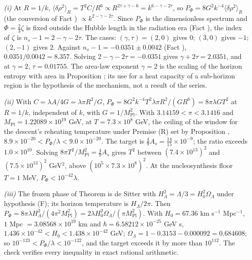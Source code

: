 \emph{(i)} At $R = 1/k$, $\langle\delta\rho^{2}\rangle_{R} = T^{2}C/R^{6} \propto R^{2\tau + \gamma - 6} = k^{6 - \gamma - 2\tau}$, so $P_{\Phi} = 8G^{2}k^{-4}\langle\delta\rho^{2}\rangle_{R}$ (the conversion of Fact ) $\propto k^{2 - \gamma - 2\tau}$. Since $P_{\Phi}$ is the dimensionless spectrum and $\Phi = \tfrac23\zeta$ is fixed outside the Hubble length in the radiation era (Fact ), the index of $\zeta$ is $n_{s} - 1 = 2 - \gamma - 2\tau$. The cases: $(\gamma, \tau) = (2, 0)$ gives $0$; $(3, 0)$ gives $-1$; $(2, -1)$ gives $2$. Against $n_{s} - 1 = -0.0351 \pm 0.0042$ (Fact ), $0.0351/0.0042 = 8.357$. Solving $2 - \gamma - 2\tau = -0.0351$ gives $\gamma + 2\tau = 2.0351$, and at $\gamma = 2$, $\tau = 0.01755$. The area-law exponent $\gamma = 2$ is the scaling of the horizon entropy with area in Proposition ; its use for a heat capacity of a sub-horizon region is the hypothesis of the mechanism, not a result of the series.

\emph{(ii)} With $C = \lambda A/4G = \lambda\pi R^{2}/G$, $P_{\Phi} = 8G^{2}k^{-4}T^{2}\lambda\pi R^{2}/(GR^{6}) = 8\pi\lambda G T^{2}$ at $R = 1/k$, independent of $k$, with $G = 1/M_{\mathrm{Pl}}^{2}$. With $3.14159 < \pi < 3.1416$ and $M_{\mathrm{Pl}} = 1.22089 \times 10^{19}$ GeV, at $T = 7.3 \times 10^{8}$ GeV, the ceiling of the window for the descent's reheating temperature under Premise (R) set by Proposition , $8.9 \times 10^{-20} < P_{\Phi}/\lambda < 9.0 \times 10^{-20}$. The target is $\tfrac49 A_{s} = \tfrac{14}{15} \times 10^{-9}$; the ratio exceeds $1.0 \times 10^{10}$. Solving $8\pi T^{2}/M_{\mathrm{Pl}}^{2} = \tfrac49 A_{s}$ gives $T^{2}$ between $(7.4 \times 10^{13})^{2}$ and $(7.5 \times 10^{13})^{2}$ GeV$^{2}$, above $(10^{5} \times 7.3 \times 10^{8})^{2}$. At the nucleosynthesis floor $T = 1$ MeV, $P_{\Phi} < 10^{-42}\lambda$.

\emph{(iii)} The frozen phase of Theorem  is de Sitter with $H_{\Lambda}^{2} = \Lambda/3 = H_{0}^{2}\Omega_{\Lambda}$ under hypothesis (F); its horizon temperature is $H_{\Lambda}/2\pi$. Then $P_{\Phi} = 8\pi\lambda H_{\Lambda}^{2}/(4\pi^{2}M_{\mathrm{Pl}}^{2}) = 2\lambda H_{0}^{2}\Omega_{\Lambda}/(\pi M_{\mathrm{Pl}}^{2})$. With $H_{0} = 67.36$ km s$^{-1}$ Mpc$^{-1}$, $1$ Mpc $= 3.08568 \times 10^{19}$ km and $\hbar = 6.58212 \times 10^{-25}$ GeV s, $1.436 \times 10^{-42} < H_{0} < 1.438 \times 10^{-42}$ GeV; $\Omega_{\Lambda} = 1 - 0.3153 - 0.000092 = 0.684608$; so $10^{-123} < P_{\Phi}/\lambda < 10^{-122}$, and the target exceeds it by more than $10^{112}$. The check verifies every inequality in exact rational arithmetic.
